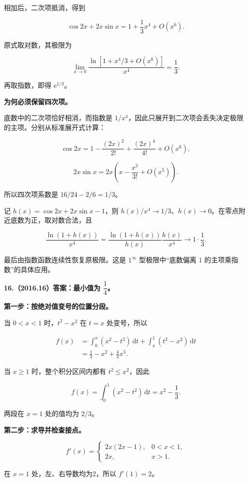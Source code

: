 \documentclass[UTF8,11pt,fontset=windows]{ctexart}
\begin{document}
相加后，二次项抵消，得到

$$
\cos2x+2x\sin x=1+\frac13x^4+O(x^6).
$$

原式取对数，其极限为

$$
\lim_{x\to0}\frac{\ln[1+x^4/3+O(x^6)]}{x^4}=\frac13.
$$

再取指数，即得 $\mathrm e^{1/3}$。

\textbf{为何必须保留四次项。}

底数中的二次项恰好相消，而指数是 $1/x^4$，因此只展开到二次项会丢失决定极限的主项。分别从标准展开式计算：

$$
\cos2x=1-\frac{(2x)^2}{2!}+\frac{(2x)^4}{4!}+O(x^6),
$$

$$
2x\sin x=2x\left(x-\frac{x^3}{3!}+O(x^5)\right).
$$

所以四次项系数是 $16/24-2/6=1/3$。

记 $h(x)=\cos2x+2x\sin x-1$，则 $h(x)/x^4\to1/3$、$h(x)\to0$。在零点附近底数为正，取对数合法，且

$$
\frac{\ln(1+h(x))}{x^4}
=\frac{\ln(1+h(x))}{h(x)}\frac{h(x)}{x^4}
\longrightarrow1\cdot\frac13.
$$

最后由指数函数连续性恢复原极限。这是 $1^\infty$ 型极限中“底数偏离 $1$ 的主项乘指数”的具体应用。

\clearpage

\textbf{16.（2016.16）答案：最小值为 $\dfrac14$。}

\textbf{第一步：按绝对值变号的位置分段。}

当 $0<x<1$ 时，$t^2-x^2$ 在 $t=x$ 处变号，所以

$$
\begin{aligned}
f(x)&=\int_0^x(x^2-t^2)\,\mathrm dt+\int_x^1(t^2-x^2)\,\mathrm dt\\
&=\frac13-x^2+\frac43x^3.
\end{aligned}
$$

当 $x\ge1$ 时，整个积分区间内都有 $t^2\le x^2$，因此

$$
f(x)=\int_0^1(x^2-t^2)\,\mathrm dt=x^2-\frac13.
$$

两段在 $x=1$ 处的值均为 $2/3$。

\textbf{第二步：求导并检查接点。}

$$
f'(x)=\begin{cases}2x(2x-1),&0<x<1,\\2x,&x>1.\end{cases}
$$

在 $x=1$ 处，左、右导数均为2，所以 $f'(1)=2$。
\end{document}
